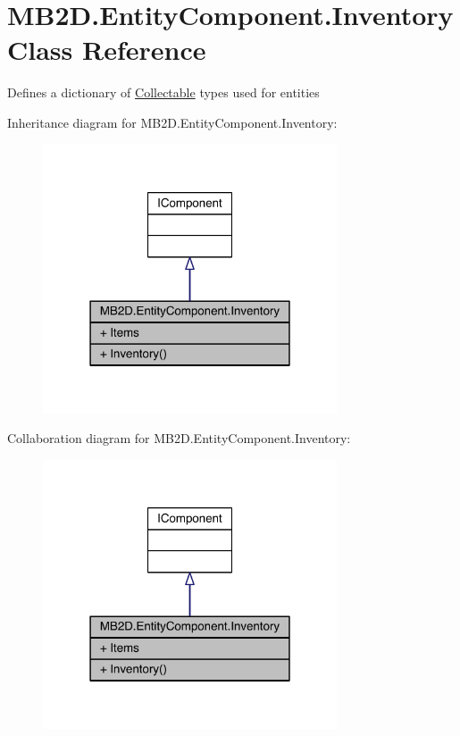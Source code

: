 \hypertarget{class_m_b2_d_1_1_entity_component_1_1_inventory}{}\section{M\+B2\+D.\+Entity\+Component.\+Inventory Class Reference}
\label{class_m_b2_d_1_1_entity_component_1_1_inventory}


Defines a dictionary of \hyperlink{class_m_b2_d_1_1_collectable}{Collectable} types used for entities  




Inheritance diagram for M\+B2\+D.\+Entity\+Component.\+Inventory\+:\nopagebreak
\begin{figure}[H]
\begin{center}
\leavevmode
\includegraphics[width=247pt]{class_m_b2_d_1_1_entity_component_1_1_inventory__inherit__graph}
\end{center}
\end{figure}


Collaboration diagram for M\+B2\+D.\+Entity\+Component.\+Inventory\+:\nopagebreak
\begin{figure}[H]
\begin{center}
\leavevmode
\includegraphics[width=247pt]{class_m_b2_d_1_1_entity_component_1_1_inventory__coll__graph}
\end{center}
\end{figure}
